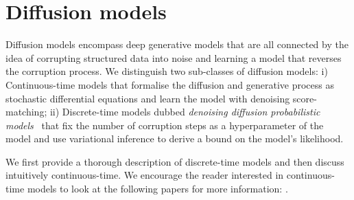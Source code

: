 \section{Diffusion models}
Diffusion models encompass deep generative models that are all connected by the idea of corrupting structured data into noise and learning a model that reverses the corruption process. We distinguish two sub-classes of diffusion models: i) Continuous-time models \citep{song_generative_2019, song2020score} that formalise the diffusion and generative process as stochastic differential equations and learn the model with denoising score-matching; ii) Discrete-time models dubbed \textit{denoising diffusion probabilistic models}~\citep[DDPM][]{sohl-dickstein_deep_2015, ho_denoising_2020} that fix the number of corruption steps as a hyperparameter of the model and use variational inference to derive a bound on the model's likelihood.

We first provide a thorough description of discrete-time models and then discuss intuitively continuous-time. We encourage the reader interested in continuous-time models to look at the following papers for more information: \citep{song_generative_2019, song2020score, song2021maximum, dockhorn2021score}.


